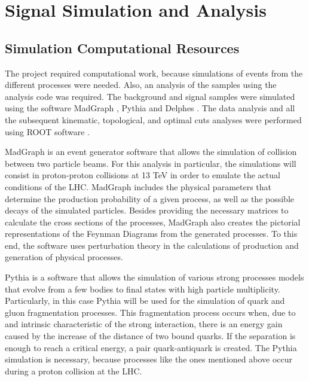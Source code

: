 \chapter{Signal Simulation and Analysis} 

\section{Simulation Computational Resources} \label{sec: simulation}


The project required computational work, because simulations of events from the different processes were needed. Also, an analysis of the samples using the analysis code was required. The background and signal samples were simulated using the software MadGraph \cite{MadGraph}, Pythia \cite{Pythia} and Delphes \cite{Delphes}. The data analysis and all the subsequent kinematic, topological, and optimal cuts analyses were performed using ROOT software \cite{ROOT}.

MadGraph is an event generator software that allows the simulation of collision between two particle beams. For this analysis in particular, the simulations will consist in proton-proton collisions at 13 TeV in order to emulate the actual conditions of the LHC. MadGraph includes the physical parameters that determine the production probability of a given process, as well as the possible decays of the simulated particles. Besides providing the necessary matrices to calculate the cross sections of the processes, MadGraph also creates the pictorial representations of the Feynman Diagrams from the generated processes. To this end, the software uses perturbation theory in the calculations of production and generation of physical processes.

Pythia is a software that allows the simulation of various strong processes models that evolve from a few bodies to final states with high particle multiplicity. Particularly, in this case Pythia will be used for the simulation of quark and gluon fragmentation processes. This fragmentation process occurs when, due to and intrinsic characteristic of the strong interaction, there is an energy gain caused by the increase of the distance of two bound quarks. If the separation is enough to reach a critical energy, a pair quark-antiquark is created. The Pythia simulation is necessary, because processes like the ones mentioned above occur during a proton collision at the LHC.

